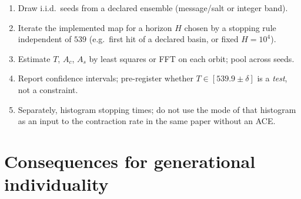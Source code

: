 \begin{definition}
\label{def:protocol}
\begin{enumerate}[label=P\arabic*.]
  \item Draw i.i.d.\ seeds from a declared ensemble (message/salt or integer
        band).
  \item Iterate the implemented map for a horizon \(H\) chosen by a stopping
        rule independent of \(539\) (e.g.\ first hit of a declared basin, or
        fixed \(H=10^4\)).
  \item Estimate \(T\), \(A_c\), \(A_s\) by least squares or FFT on each orbit;
        pool across seeds.
  \item Report confidence intervals; pre-register whether \(T\in[539.9\pm\delta]\)
        is a \emph{test}, not a constraint.
  \item Separately, histogram stopping times; do not use the mode of that
        histogram as an input to the contraction rate in the same paper without
        an ACE.
\end{enumerate}
\end{definition}

\begin{corollary}
\label{cor:language}
\end{corollary}

\section{Consequences for generational individuality}
\label{sec:indiv-nogo}


